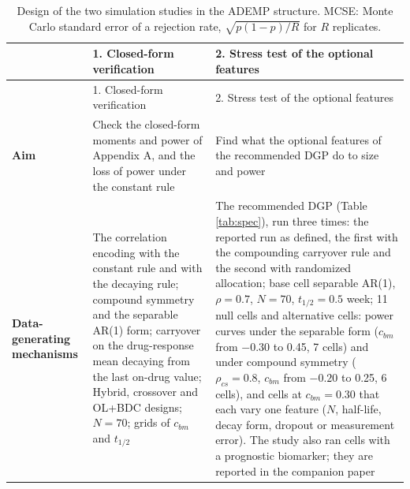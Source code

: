 \documentclass[
  11pt,
]{article}
\begin{document}
\begin{longtable}[]{@{}
  >{\raggedright\arraybackslash}p{}
  >{\raggedright\arraybackslash}p{}
  >{\raggedright\arraybackslash}p{}@{}}
\caption{\label{tab:ademp} Design of the two simulation studies in the
ADEMP structure. MCSE: Monte Carlo standard error of a rejection rate,
\(\sqrt{p(1-p)/R}\) for \(R\) replicates.}\tabularnewline
\toprule\noalign{}
\begin{minipage}[b]{\linewidth}\raggedright
\end{minipage} & \begin{minipage}[b]{\linewidth}\raggedright
1. Closed-form verification
\end{minipage} & \begin{minipage}[b]{\linewidth}\raggedright
2. Stress test of the optional features
\end{minipage} \\
\midrule\noalign{}
\endfirsthead
\toprule\noalign{}
\begin{minipage}[b]{\linewidth}\raggedright
\end{minipage} & \begin{minipage}[b]{\linewidth}\raggedright
1. Closed-form verification
\end{minipage} & \begin{minipage}[b]{\linewidth}\raggedright
2. Stress test of the optional features
\end{minipage} \\
\midrule\noalign{}
\endhead
\bottomrule\noalign{}
\endlastfoot
\textbf{Aim} & Check the closed-form moments and power of Appendix A, and the loss of power under the constant rule & Find what the optional features of the recommended DGP do to size and power \\
\textbf{Data-generating mechanisms} & The correlation encoding with the constant rule and with the decaying rule; compound symmetry and the separable AR(1) form; carryover on the drug-response mean decaying from the last on-drug value; Hybrid, crossover and OL+BDC designs; \(N = 70\); grids of \(c_{bm}\) and \(t_{1/2}\) & The recommended DGP (Table \ref{tab:spec}), run three times: the reported run as defined, the first with the compounding carryover rule and the second with randomized allocation; base cell separable AR(1), \(\rho = 0.7\), \(N = 70\), \(t_{1/2} = 0.5\) week; 11 null cells and alternative cells: power curves under the separable form (\(c_{bm}\) from \(-0.30\) to 0.45, 7 cells) and under compound symmetry (\(\rho_{cs} = 0.8\), \(c_{bm}\) from \(-0.20\) to 0.25, 6 cells), and cells at \(c_{bm} = 0.30\) that each vary one feature (\(N\), half-life, decay form, dropout or measurement error). The study also ran cells with a prognostic biomarker; they are reported in the companion paper \\

\end{longtable}
\end{document}
